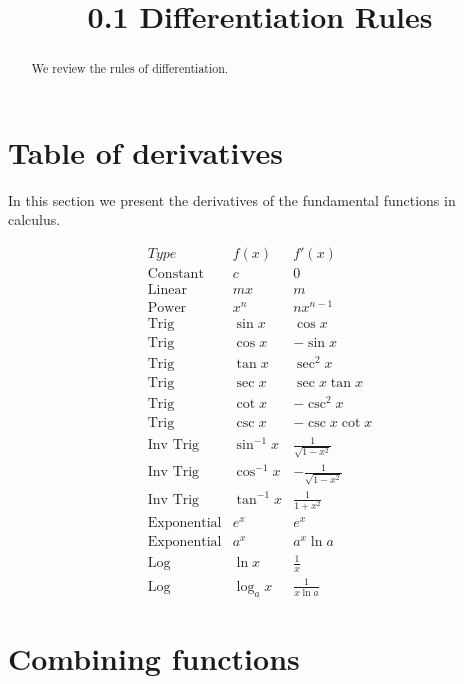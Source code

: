 \documentclass[handout]{ximera}
\title{0.1 Differentiation Rules}
\begin{document}
\begin{abstract}
We review the rules of differentiation.
\end{abstract}

\maketitle


\section{Table of derivatives}

In this section we present the derivatives of the fundamental functions in calculus.  

\begin{center}
\[
\begin{array}{c|c|c}
		Type & f(x) & f'(x)  \\
		\hline
		\text{Constant} & c & 0 \\
		\text{Linear} & mx & m  \\
		\text{Power} & x^n & nx^{n-1}  \\
		\hline
		\text{Trig} & \sin x & \cos x \\
		\text{Trig} & \cos x & -\sin x \\
		\hline
		\text{Trig} & \tan x & \sec^2 x \\
		\text{Trig} & \sec x & \sec x\tan x \\
		\hline
		\text{Trig} & \cot x & -\csc^2 x\ \\
		\text{Trig} & \csc x & -\csc x\cot x \\
		\hline
		\text{Inv Trig} & \sin^{-1} x & \frac{1}{\sqrt{1-x^2}} \\
		\text{Inv Trig} & \cos^{-1} x & -\frac{1}{\sqrt{1-x^2}} \\
		\text{Inv Trig} & \tan^{-1} x & \frac{1}{1+x^2} \\
		\hline
		\text{Exponential} & e^x & e^x \\
		\text{Exponential} & a^x & a^x\ln a \\
		\hline
		\text{Log} & \ln x & \frac{1}{x} \\
		\text{Log} & \log_a x & \frac{1}{x\ln a}
	\end{array}
    \]
\end{center}


\section{Combining functions}
\end{document}
